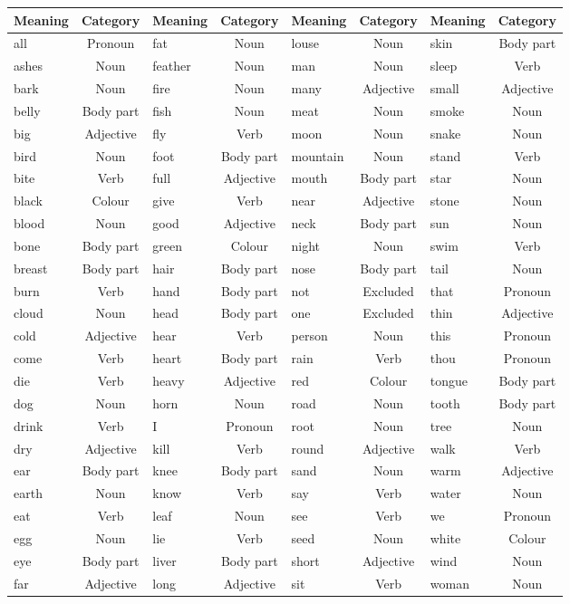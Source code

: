 \begin{tabular}{|l|c||l|c||l|c||l|c|}
    \hline
    Meaning & Category & Meaning & Category & Meaning & Category & Meaning & Category\\ \hline

all & Pronoun & fat & Noun & louse & Noun & skin & Body part\\ 
ashes & Noun & feather & Noun & man & Noun & sleep & Verb\\ 
bark & Noun & fire & Noun & many & Adjective & small & Adjective\\ 
belly & Body part & fish & Noun & meat & Noun & smoke & Noun\\ 
big & Adjective & fly & Verb & moon & Noun & snake & Noun\\ 
bird & Noun & foot & Body part & mountain & Noun & stand & Verb\\ 
bite & Verb & full & Adjective & mouth & Body part & star & Noun\\ 
black & Colour & give & Verb & near & Adjective & stone & Noun\\ 
blood & Noun & good & Adjective & neck & Body part & sun & Noun\\ 
bone & Body part & green & Colour & night & Noun & swim & Verb\\ 
breast & Body part & hair & Body part & nose & Body part & tail & Noun\\ 
burn & Verb & hand & Body part & not & Excluded & that & Pronoun\\ 
cloud & Noun & head & Body part & one & Excluded & thin & Adjective\\ 
cold & Adjective & hear & Verb & person & Noun & this & Pronoun\\ 
come & Verb & heart & Body part & rain & Verb & thou & Pronoun\\ 
die & Verb & heavy & Adjective & red & Colour & tongue & Body part\\ 
dog & Noun & horn & Noun & road & Noun & tooth & Body part\\ 
drink & Verb & I & Pronoun & root & Noun & tree & Noun\\ 
dry & Adjective & kill & Verb & round & Adjective & walk & Verb\\ 
ear & Body part & knee & Body part & sand & Noun & warm & Adjective\\ 
earth & Noun & know & Verb & say & Verb & water & Noun\\ 
eat & Verb & leaf & Noun & see & Verb & we & Pronoun\\ 
egg & Noun & lie & Verb & seed & Noun & white & Colour\\ 
eye & Body part & liver & Body part & short & Adjective & wind & Noun\\ 
far & Adjective & long & Adjective & sit & Verb & woman & Noun\\ 
\hline
\end{tabular}

